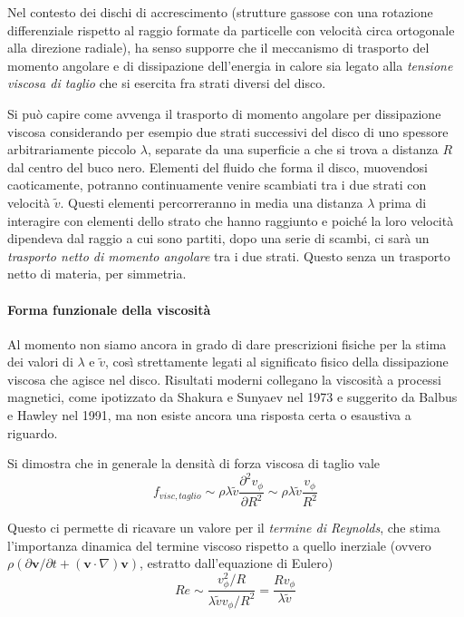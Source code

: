 \documentclass[a4paperbi]{article}
\begin{document}
	Nel contesto dei dischi di accrescimento (strutture gassose con una rotazione differenziale rispetto al raggio formate da particelle con velocità circa ortogonale alla direzione radiale), ha senso supporre che il meccanismo di trasporto del momento angolare e di dissipazione dell'energia in calore sia legato alla \textit{tensione viscosa di taglio} che si esercita fra strati diversi del disco.
	
	Si può capire come avvenga il trasporto di momento angolare per dissipazione viscosa considerando per esempio due strati successivi del disco di uno spessore arbitrariamente piccolo $\lambda$, separate da una superficie a che si trova a distanza $R$ dal centro del buco nero. Elementi del fluido che forma il disco, muovendosi caoticamente, potranno continuamente venire scambiati tra i due strati con velocità $\tilde{v}$. Questi elementi percorreranno in media una distanza $\lambda$ prima di interagire con elementi dello strato che hanno raggiunto e poiché la loro velocità dipendeva dal raggio a cui sono partiti, dopo una serie di scambi, ci sarà un \textit{trasporto netto di momento angolare} tra i due strati. Questo senza un trasporto netto di materia, per simmetria.
	
	\paragraph{Forma funzionale della viscosità}	
	Al momento non siamo ancora in grado di dare prescrizioni fisiche per la stima dei valori di $\lambda$ e $\tilde{v}$, così strettamente legati al significato fisico della dissipazione viscosa che agisce nel disco. Risultati moderni collegano la viscosità a processi magnetici, come ipotizzato da Shakura e Sunyaev nel 1973 e suggerito da Balbus e Hawley nel 1991, ma non esiste ancora una risposta certa o esaustiva a riguardo. 
	
	Si dimostra che in generale la densità di forza viscosa di taglio vale
	\begin{equation}
		f_{visc,taglio}\sim\rho\lambda\tilde{v}\frac{\partial^2v_\phi}{\partial R^2}\sim\rho\lambda\tilde{v}\frac{v_\phi}{R^2}
	\end{equation}

	Questo ci permette di ricavare un valore per il \textit{termine di Reynolds}, che stima l'importanza dinamica del termine viscoso rispetto a quello inerziale (ovvero $\rho(\partial\textbf{v}/\partial t+(\textbf{v}\cdot\nabla)\textbf{v})$, estratto dall'equazione di Eulero)
	\begin{equation}
		Re\sim\frac{v_\phi^2/R}{\lambda\tilde{v}v_\phi/R^2}=\frac{Rv_\phi}{\lambda\tilde{v}}
	\end{equation}
	
\end{document}
